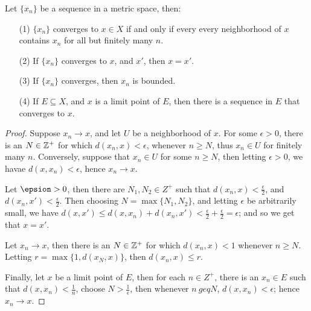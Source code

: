 \begin{theorem}\label{3.1.1}
    Let $\{x_n\}$ be a sequence in a metric space, then:
        \begin{enumerate}
            \item[(1)] $\{x_n\}$ converges to  $x \in X$ if and only if every every neighborhood
                of $x$ contains  $x_n$ for all but finitely many  $n$.

            \item[(2)] If  $\{x_n\}$ converges to  $x$, and  $x'$, then $x=x'$.

            \item[(3)] If $\{x_n\}$ converges, then  $x_n$ is bounded.

            \item[(4)] If $E \subseteq X$, and  $x$ is a limit point of  $E$, then there
                is a sequence  in  $E$ that converges to  $x$.
        \end{enumerate}
\end{theorem}
\begin{proof}
    Suppose $x_n \rightarrow x$, and let  $U$ be a neighborhood of  $x$. For some  $\epsilon>0$,
    there is an $N \in \mathbb{Z}^+$ for which $d(x_n,x)<\epsilon$, whenever $n \geq N$, thus
    $x_n \in U$ for finitely many  $n$. Conversely, suppose that  $x_n \in U$ for
    some  $n \geq N$, then  letting  $\epsilon>0$, we havae  $d(x,x_n)<\epsilon$, hence
    $x_n \rightarrow x$.

    Let  $\epsion>0$, then there are $N_1,N_2 \in Z^+$ such that $d(x_n,x)<\frac{\epsilon}{2}$,
    and $d(x_n,x')<\frac{\epsilon}{2}$. Then choosing $N=\max\{N_1,N_2\}$, and letting
    $\epsilon$ be arbitrarily small, we have  $d(x,x') \leq d(x,x_n)+d(x_n,x')<\frac{\epsilon}{2}+
    \frac{\epsilon}{2}=\epsilon$; and so we get that $x=x'$.

    Let  $x_n \rightarrow x$, then there is an  $N \in \mathbb{Z}^+$ for which  $d(x_n,x)<1$ whenever
    $n \geq N$. Letting  $r=\max\{1,d(x_N,x)\}$, then  $d(x_n,x) \leq r$.

    Finally, let $x$ be a limit point of  $E$, then for each  $n \in Z^+$, there is an  $x_n \in E$
    such that  $d(x,x_n)<\frac{1}{n}$, choose $N>\frac{1}{\epsilon}$, then whenever $n\ geq N$,
    $d(x,x_n)<\epsilon$; hence  $x_n \rightarrow x$.
\end{proof}


